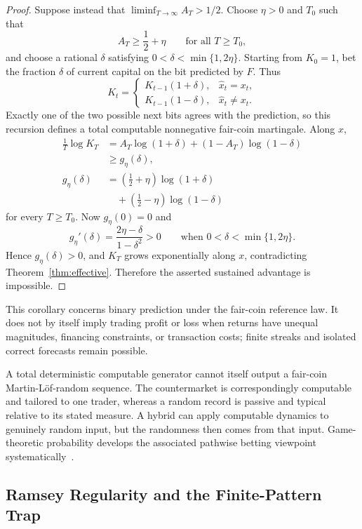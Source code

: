 \documentclass[aps,pra,reprint,superscriptaddress,amsmath,amssymb,floatfix]{revtex4-2}
\theoremstyle{plain}
\theoremstyle{definition}
\theoremstyle{remark}
\begin{document}
\begin{proof}
Suppose instead that \(\liminf_{T\to\infty}A_T>1/2\). Choose
\(\eta>0\) and \(T_0\) such that
\[
  A_T\geq\frac12+\eta
  \qquad\text{for all }T\geq T_0,
\]
and choose a rational \(\delta\) satisfying
\(0<\delta<\min\{1,2\eta\}\). Starting from \(K_0=1\), bet the fraction
\(\delta\) of current capital on the bit predicted by \(F\). Thus
\[
  K_t=
  \begin{cases}
    K_{t-1}(1+\delta),&\widehat x_t=x_t,\\
    K_{t-1}(1-\delta),&\widehat x_t\neq x_t.
  \end{cases}
\]
Exactly one of the two possible next bits agrees with the prediction, so this
recursion defines a total computable nonnegative fair-coin martingale. Along
\(x\),
\begin{align*}
  \frac1T\log K_T
  &=A_T\log(1+\delta)+(1-A_T)\log(1-\delta)\\
  &\geq g_\eta(\delta),\\
  g_\eta(\delta)
  &=\left(\frac12+\eta\right)\log(1+\delta)\\
  &\quad+\left(\frac12-\eta\right)\log(1-\delta)
\end{align*}
for every \(T\geq T_0\). Now \(g_\eta(0)=0\) and
\[
  g_\eta'(\delta)=\frac{2\eta-\delta}{1-\delta^2}>0
  \qquad\text{when }0<\delta<\min\{1,2\eta\}.
\]
Hence \(g_\eta(\delta)>0\), and \(K_T\) grows exponentially along \(x\),
contradicting Theorem~\ref{thm:effective}. Therefore the asserted sustained
advantage is impossible.
\end{proof}

This corollary concerns binary prediction under the fair-coin reference law.
It does not by itself imply trading profit or loss when returns have unequal
magnitudes, financing constraints, or transaction costs; finite streaks and
isolated correct forecasts remain possible.

A total deterministic computable generator cannot itself output a fair-coin
Martin-L\"of-random sequence. The countermarket is correspondingly computable
and tailored to one trader, whereas a random record is passive and typical
relative to its stated measure. A hybrid can apply computable dynamics to
genuinely random input, but the randomness then comes from that input.
Game-theoretic probability develops the associated pathwise betting viewpoint
systematically~\cite{ShaferVovk2001}.

\subsection{Ramsey Regularity and the Finite-Pattern Trap}
\label{sec:ramseytrap}
\end{document}
